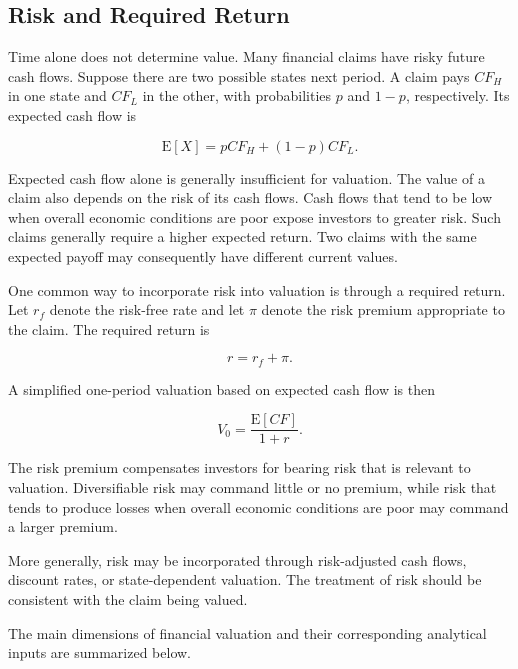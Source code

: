 \subsection{Risk and Required Return}

Time alone does not determine value. Many financial claims have risky future cash flows. Suppose there are two possible states next period. A claim pays $CF_H$ in one state and $CF_L$ in the other, with probabilities $p$ and $1-p$, respectively. Its expected cash flow is

\begin{equation}
\mathrm{E}[X]=pCF_H+(1-p)CF_L.
\label{eq:ch5-expected-cash-flow}
\end{equation}

Expected cash flow alone is generally insufficient for valuation. The value of a claim also depends on the risk of its cash flows. Cash flows that tend to be low when overall economic conditions are poor expose investors to greater risk. Such claims generally require a higher expected return. Two claims with the same expected payoff may consequently have different current values.

One common way to incorporate risk into valuation is through a required return. Let $r_f$ denote the risk-free rate and let $\pi$ denote the risk premium appropriate to the claim. The required return is

\begin{equation}
r=r_f+\pi.
\label{eq:ch5-required-return}
\end{equation}

A simplified one-period valuation based on expected cash flow is then

\begin{equation}
V_0=\frac{\mathrm{E}[CF]}{1+r}.
\label{eq:ch5-risk-adjusted-discount}
\end{equation}

The risk premium compensates investors for bearing risk that is relevant to valuation. Diversifiable risk may command little or no premium, while risk that tends to produce losses when overall economic conditions are poor may command a larger premium.

More generally, risk may be incorporated through risk-adjusted cash flows, discount rates, or state-dependent valuation. The treatment of risk should be consistent with the claim being valued.

\medskip

The main dimensions of financial valuation and their corresponding analytical inputs are summarized below.

